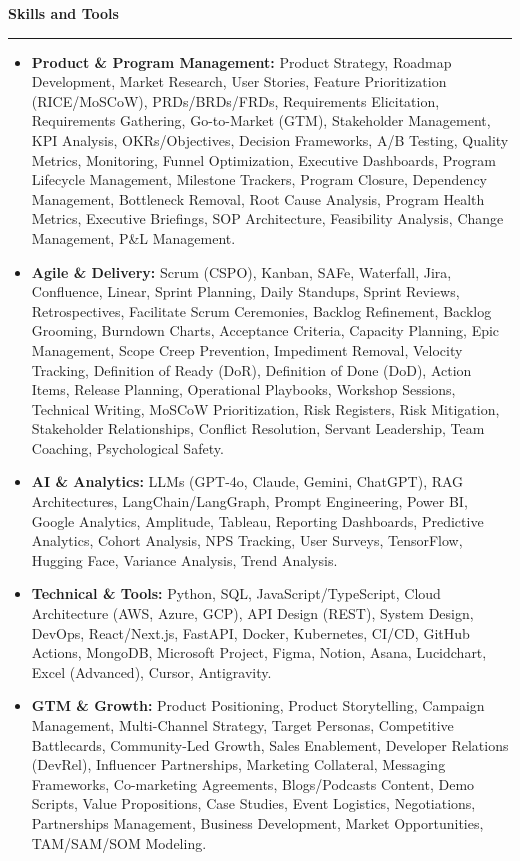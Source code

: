 \documentclass[9pt,letterpaper]{article} %
\newenvironment{rSection}[1]{ %
  \sectionskip
 \textbf{\Large #1} %
  \sectionlineskip
  \hrule %
  \begin{list}{}{ %
    \setlength{\leftmargin}{-0em} %
  }
  \item[]
}{
  \end{list}
}
\def\sectionlineskip{\smallskip} %
\def\sectionskip{} %
\begin{document}
\begin{rSection}{Skills and Tools}
\begin{itemize}[left=-1.5em, labelsep=.1cm, labelwidth=.2cm, itemsep=0.0em, topsep=0pt]
\item \textbf{Product \& Program Management:} Product Strategy, Roadmap Development, Market Research, User Stories, Feature Prioritization (RICE/MoSCoW), PRDs/BRDs/FRDs, Requirements Elicitation, Requirements Gathering, Go-to-Market (GTM), Stakeholder Management, KPI Analysis, OKRs/Objectives, Decision Frameworks, A/B Testing, Quality Metrics, Monitoring, Funnel Optimization, Executive Dashboards, Program Lifecycle Management, Milestone Trackers, Program Closure, Dependency Management, Bottleneck Removal, Root Cause Analysis, Program Health Metrics, Executive Briefings, SOP Architecture, Feasibility Analysis, Change Management, P\&L Management.
\item \textbf{Agile \& Delivery:} Scrum (CSPO), Kanban, SAFe, Waterfall, Jira, Confluence, Linear, Sprint Planning, Daily Standups, Sprint Reviews, Retrospectives, Facilitate Scrum Ceremonies, Backlog Refinement, Backlog Grooming, Burndown Charts, Acceptance Criteria, Capacity Planning, Epic Management, Scope Creep Prevention, Impediment Removal, Velocity Tracking, Definition of Ready (DoR), Definition of Done (DoD), Action Items, Release Planning, Operational Playbooks, Workshop Sessions, Technical Writing, MoSCoW Prioritization, Risk Registers, Risk Mitigation, Stakeholder Relationships, Conflict Resolution, Servant Leadership, Team Coaching, Psychological Safety.
\item \textbf{AI \& Analytics:} LLMs (GPT-4o, Claude, Gemini, ChatGPT), RAG Architectures, LangChain/LangGraph, Prompt Engineering, Power BI, Google Analytics, Amplitude, Tableau, Reporting Dashboards, Predictive Analytics, Cohort Analysis, NPS Tracking, User Surveys, TensorFlow, Hugging Face, Variance Analysis, Trend Analysis.
\item \textbf{Technical \& Tools:} Python, SQL, JavaScript/TypeScript, Cloud Architecture (AWS, Azure, GCP), API Design (REST), System Design, DevOps, React/Next.js, FastAPI, Docker, Kubernetes, CI/CD, GitHub Actions, MongoDB, Microsoft Project, Figma, Notion, Asana, Lucidchart, Excel (Advanced), Cursor, Antigravity.
\item \textbf{GTM \& Growth:} Product Positioning, Product Storytelling, Campaign Management, Multi-Channel Strategy, Target Personas, Competitive Battlecards, Community-Led Growth, Sales Enablement, Developer Relations (DevRel), Influencer Partnerships, Marketing Collateral, Messaging Frameworks, Co-marketing Agreements, Blogs/Podcasts Content, Demo Scripts, Value Propositions, Case Studies, Event Logistics, Negotiations, Partnerships Management, Business Development, Market Opportunities, TAM/SAM/SOM Modeling.
\end{itemize}
\end{rSection}%
\end{document}
